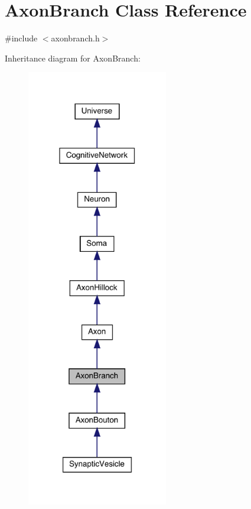 \hypertarget{class_axon_branch}{}\section{Axon\+Branch Class Reference}
\label{class_axon_branch}


{\ttfamily \#include $<$axonbranch.\+h$>$}



Inheritance diagram for Axon\+Branch\+:\nopagebreak
\begin{figure}[H]
\begin{center}
\leavevmode
\includegraphics[width=175pt]{class_axon_branch__inherit__graph}
\end{center}
\end{figure}


